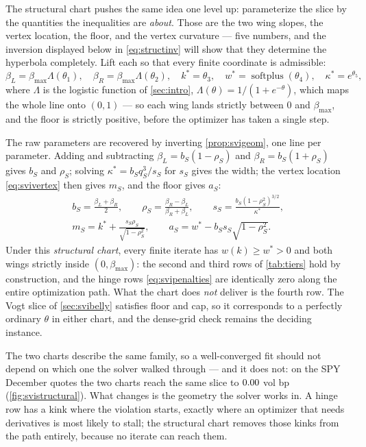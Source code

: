 The structural chart pushes the same idea one level up: parameterize
the slice by the quantities the inequalities are \emph{about}.  Those
are the two wing slopes, the vertex location, the floor, and the vertex
curvature --- five numbers, and the inversion displayed below in
\eqref{eq:structinv} will show that they determine the hyperbola
completely.  Lift each so that every finite coordinate is admissible:
\begin{equation}
\beta_L=\beta_{\max}\Lambda(\theta_1),\quad
\beta_R=\beta_{\max}\Lambda(\theta_2),\quad
k^*=\theta_3,\quad
w^*=\operatorname{softplus}(\theta_4),\quad
\kappa^*=e^{\theta_5},
\label{eq:structlift}
\end{equation}
where $\Lambda$ is the logistic function of \cref{sec:intro},
$\Lambda(\theta)=1/(1+e^{-\theta})$, which maps the whole line onto
$(0,1)$ --- so each wing lands strictly between $0$ and
$\beta_{\max}$, and the floor is strictly positive, before the
optimizer has taken a single step.

The raw parameters are recovered by inverting \cref{prop:svigeom}, one
line per parameter.  Adding and subtracting
$\beta_L=b_S(1-\rho_S)$ and $\beta_R=b_S(1+\rho_S)$ gives $b_S$ and
$\rho_S$; solving $\kappa^*=b_Sq_S^3/s_S$ for $s_S$ gives the width;
the vertex location \eqref{eq:svivertex} then gives $m_S$, and the
floor gives $a_S$:
\begin{equation}
\begin{gathered}
b_S=\frac{\beta_L+\beta_R}{2},\qquad
\rho_S=\frac{\beta_R-\beta_L}{\beta_R+\beta_L},\qquad
s_S=\frac{b_S(1-\rho_S^2)^{3/2}}{\kappa^*},\\
m_S=k^*+\frac{s_S\rho_S}{\sqrt{1-\rho_S^2}},\qquad
a_S=w^*-b_Ss_S\sqrt{1-\rho_S^2}.
\end{gathered}
\label{eq:structinv}
\end{equation}
Under this \emph{structural chart}, every finite iterate has
$w(k)\ge w^*>0$ and both wings strictly inside $(0,\beta_{\max})$: the
second and third rows of \cref{tab:tiers} hold by construction, and
the hinge rows \eqref{eq:svipenalties} are identically zero along the
entire optimization path.  What the chart does \emph{not} deliver is
the fourth row.  The Vogt slice of \cref{sec:svibelly} satisfies
floor and cap, so it corresponds to a perfectly ordinary $\theta$ in
either chart, and the dense-grid check remains the deciding instance.

The two charts describe the same family, so a well-converged fit should
not depend on which one the solver walked through --- and it does not:
on the SPY December quotes the two charts reach the same slice to
$0.00$ vol bp (\cref{fig:svistructural}).  What changes
is the geometry the solver works in.  A hinge row has a kink where the
violation starts, exactly where an optimizer that needs derivatives is
most likely to stall; the structural chart removes those kinks from the
path entirely, because no iterate can reach them.

